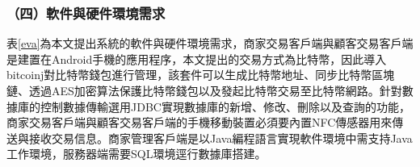 	\subsubsection{（四）軟件與硬件環境需求}
	表\ref{eva}為本文提出系統的軟件與硬件環境需求，商家交易客戶端與顧客交易客戶端是建置在Android手機的應用程序，本文提出的交易方式為比特幣，因此導入bitcoinj\supercite{Bitcoinclients}對比特幣錢包進行管理，該套件可以生成比特幣地址、同步比特幣區塊鏈、透過AES加密算法保護比特幣錢包以及發起比特幣交易至比特幣網路。針對數據庫的控制數據傳輸選用JDBC\supercite{JDBCdatabaseaccesswithJava:atutorialandannotatedreference}實現數據庫的新增、修改、刪除以及查詢的功能，商家交易客戶端與顧客交易客戶端的手機移動裝置必須要內置NFC傳感器用來傳送與接收交易信息。商家管理客戶端是以Java編程語言實現軟件環境中需支持Java工作環境，服務器端需要SQL環境逕行數據庫搭建。


